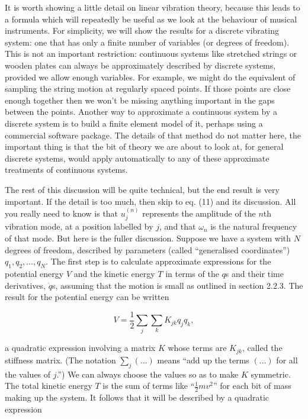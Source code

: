   It is worth showing a little detail on linear vibration theory, because this 
  leads to a formula which will repeatedly be useful as we look at the 
  behaviour of musical instruments. For simplicity, we will show the results 
  for a discrete vibrating system: one that has only a finite number of 
  variables (or degrees of freedom). This is not an important restriction: 
  continuous systems like stretched strings or wooden plates can always be 
  approximately described by discrete systems, provided we allow enough 
  variables. For example, we might do the equivalent of sampling the string 
  motion at regularly spaced points. If those points are close enough together 
  then we won't be missing anything important in the gaps between the points. 
  Another way to approximate a continuous system by a discrete system is to 
  build a finite element model of it, perhaps using a commercial software 
  package. The details of that method do not matter here, the important thing 
  is that the bit of theory we are about to look at, for general discrete 
  systems, would apply automatically to any of these approximate treatments of 
  continuous systems. 

  The rest of this discussion will be quite technical, but the end result is 
  very important. If the detail is too much, then skip to eq. (11) and its 
  discussion. All you really need to know is that $u_j^{(n)}$ represents the 
  amplitude of the $n$th vibration mode, at a position labelled by $j$, and 
  that $\omega_n$ is the natural frequency of that mode. But here is the fuller 
  discussion. Suppose we have a system with $N$ degrees of freedom, described 
  by parameters (called ``generalised coordinates'') $q_1,q_2,\dots,q_N$. The 
  first step is to calculate approximate expressions for the potential energy 
  $V$ and the kinetic energy $T$ in terms of the $q$s and their time 
  derivatives, $\dot{q}$s, assuming that the motion is small as outlined in 
  section 2.2.3. The result for the potential energy can be written 

  $$V=\dfrac{1}{2}\sum_j \sum_k K_{jk} q_j q_k, \tag{1} $$ 

  a quadratic expression involving a matrix $K$ whose terms are $K_{jk}$, 
  called the stiffness matrix. (The notation $\sum_j(\dots)$ means ``add up the 
  terms $(\dots)$ for all the values of $j$.'') We can always choose the values 
  so as to make $K$ symmetric. The total kinetic energy $T$ is the sum of terms 
  like ``$\frac{1}{2}mv^2$'' for each bit of mass making up the system. It 
  follows that it will be described by a quadratic expression 

